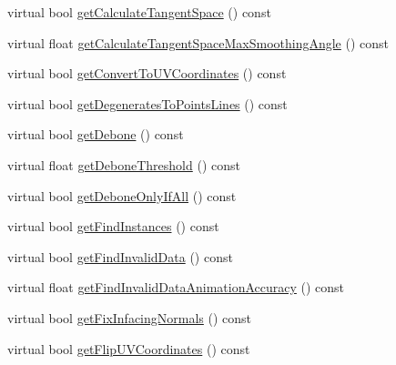 \begin{DoxyCompactItemize}
\item 
virtual bool \hyperlink{classrepo_1_1manipulator_1_1modelconvertor_1_1_model_import_config_abbed1400132285df488e3d49bd5c6a64}{get\+Calculate\+Tangent\+Space} () const 
\item 
virtual float \hyperlink{classrepo_1_1manipulator_1_1modelconvertor_1_1_model_import_config_af787824e4a1737233f74d16ec26bfa9c}{get\+Calculate\+Tangent\+Space\+Max\+Smoothing\+Angle} () const 
\item 
virtual bool \hyperlink{classrepo_1_1manipulator_1_1modelconvertor_1_1_model_import_config_a272769fa5299f0b877256cbb9f182ee0}{get\+Convert\+To\+U\+V\+Coordinates} () const 
\item 
virtual bool \hyperlink{classrepo_1_1manipulator_1_1modelconvertor_1_1_model_import_config_a2ec24b0921862f273025d4421c153c5b}{get\+Degenerates\+To\+Points\+Lines} () const 
\item 
virtual bool \hyperlink{classrepo_1_1manipulator_1_1modelconvertor_1_1_model_import_config_a58d4c2ec483c9886b9ee872211210af8}{get\+Debone} () const 
\item 
virtual float \hyperlink{classrepo_1_1manipulator_1_1modelconvertor_1_1_model_import_config_a7c062c8cbc8574c57f3ffb3ad4b533d9}{get\+Debone\+Threshold} () const 
\item 
virtual bool \hyperlink{classrepo_1_1manipulator_1_1modelconvertor_1_1_model_import_config_ac992c3d0ad11d304bc2a3474bc213754}{get\+Debone\+Only\+If\+All} () const 
\item 
virtual bool \hyperlink{classrepo_1_1manipulator_1_1modelconvertor_1_1_model_import_config_ab14b8ef0f5b2cfec9da90fa254de2133}{get\+Find\+Instances} () const 
\item 
virtual bool \hyperlink{classrepo_1_1manipulator_1_1modelconvertor_1_1_model_import_config_a0d18d6f7c1c3963defa9a45dc2f30db0}{get\+Find\+Invalid\+Data} () const 
\item 
virtual float \hyperlink{classrepo_1_1manipulator_1_1modelconvertor_1_1_model_import_config_ad7ac71713603d1552fc88770e6ed242e}{get\+Find\+Invalid\+Data\+Animation\+Accuracy} () const 
\item 
virtual bool \hyperlink{classrepo_1_1manipulator_1_1modelconvertor_1_1_model_import_config_aa38d7052ee4e0d3af449bdfe729a3afb}{get\+Fix\+Infacing\+Normals} () const 
\item 
virtual bool \hyperlink{classrepo_1_1manipulator_1_1modelconvertor_1_1_model_import_config_a71f86ead55f59f035bec9db32f3aaad0}{get\+Flip\+U\+V\+Coordinates} () const 
\item 

\end{DoxyCompactItemize}
